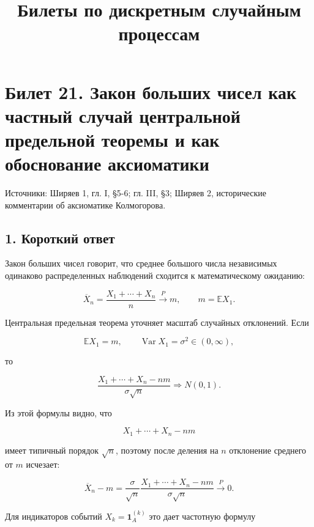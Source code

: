 \documentclass[
  11pt,
  a4paper,
]{article}
\title{Билеты по дискретным случайным процессам}
\author{}
\date{}
\begin{document}
\maketitle

\section{Билет 21. Закон больших чисел как частный случай центральной
предельной теоремы и как обоснование
аксиоматики}\label{ux431ux438ux43bux435ux442-21.-ux437ux430ux43aux43eux43d-ux431ux43eux43bux44cux448ux438ux445-ux447ux438ux441ux435ux43b-ux43aux430ux43a-ux447ux430ux441ux442ux43dux44bux439-ux441ux43bux443ux447ux430ux439-ux446ux435ux43dux442ux440ux430ux43bux44cux43dux43eux439-ux43fux440ux435ux434ux435ux43bux44cux43dux43eux439-ux442ux435ux43eux440ux435ux43cux44b-ux438-ux43aux430ux43a-ux43eux431ux43eux441ux43dux43eux432ux430ux43dux438ux435-ux430ux43aux441ux438ux43eux43cux430ux442ux438ux43aux438}

Источники: Ширяев 1, гл. I, §5-6; гл. III, §3; Ширяев 2, исторические
комментарии об аксиоматике Колмогорова.

\subsection{1. Короткий
ответ}\label{ux43aux43eux440ux43eux442ux43aux438ux439-ux43eux442ux432ux435ux442}

Закон больших чисел говорит, что среднее большого числа независимых
одинаково распределенных наблюдений сходится к математическому ожиданию:

\[
\overline X_n=\frac{X_1+\cdots+X_n}{n}\xrightarrow{P}m,
\qquad
m=\mathbb EX_1.
\]

Центральная предельная теорема уточняет масштаб случайных отклонений.
Если

\[
\mathbb EX_1=m,
\qquad
\operatorname{Var}X_1=\sigma^2\in(0,\infty),
\]

то

\[
\frac{X_1+\cdots+X_n-nm}{\sigma\sqrt n}
\Rightarrow
N(0,1).
\]

Из этой формулы видно, что

\[
X_1+\cdots+X_n-nm
\]

имеет типичный порядок \(\sqrt n\), поэтому после деления на \(n\)
отклонение среднего от \(m\) исчезает:

\[
\overline X_n-m
=
\frac{\sigma}{\sqrt n}
\frac{X_1+\cdots+X_n-nm}{\sigma\sqrt n}
\xrightarrow{P}0.
\]

Для индикаторов событий \(X_k=\mathbf 1_A^{(k)}\) это дает частотную
формулу
\end{document}
